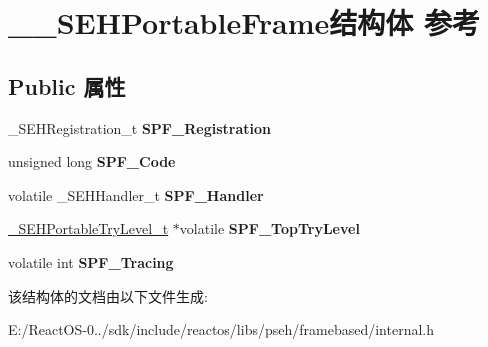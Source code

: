 \hypertarget{struct_____s_e_h_portable_frame}{}\section{\+\_\+\+\_\+\+S\+E\+H\+Portable\+Frame结构体 参考}
\label{struct_____s_e_h_portable_frame}
\subsection*{Public 属性}
\begin{DoxyCompactItemize}
\item 
\mbox{\label{struct_____s_e_h_portable_frame_a7deec29cae313cc4c40dda9aff8ada69}} 
\+\_\+\+S\+E\+H\+Registration\+\_\+t {\bfseries S\+P\+F\+\_\+\+Registration}
\item 
\mbox{\label{struct_____s_e_h_portable_frame_a05d8e4275de451ae00c9a61b9695dfc5}} 
unsigned long {\bfseries S\+P\+F\+\_\+\+Code}
\item 
\mbox{\label{struct_____s_e_h_portable_frame_a5f67713d553ac8bcecaad4663a07792f}} 
volatile \+\_\+\+S\+E\+H\+Handler\+\_\+t {\bfseries S\+P\+F\+\_\+\+Handler}
\item 
\mbox{\label{struct_____s_e_h_portable_frame_a8829905703ba5064b8d996d4b42cea92}} 
\hyperlink{struct_____s_e_h_portable_try_level}{\+\_\+\+S\+E\+H\+Portable\+Try\+Level\+\_\+t} $\ast$volatile {\bfseries S\+P\+F\+\_\+\+Top\+Try\+Level}
\item 
\mbox{\label{struct_____s_e_h_portable_frame_a6733b92781ad615f6e488026110239db}} 
volatile int {\bfseries S\+P\+F\+\_\+\+Tracing}
\end{DoxyCompactItemize}


该结构体的文档由以下文件生成\+:\begin{DoxyCompactItemize}
\item 
E\+:/\+React\+O\+S-\/0../sdk/include/reactos/libs/pseh/framebased/internal.\+h\end{DoxyCompactItemize}
